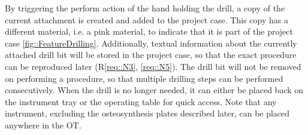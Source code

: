 By triggering the perform action of the hand holding the drill, a copy of the current attachment is created and added to the project case. 
This copy has a different material, i.e. a pink material, to indicate that it is part of the project case \ref{fig::FeatureDrilling}.
Additionally, textual information about the currently attached drill bit will be stored in the project case, so that the exact procedure can be reproduced later (R\ref{req::N3}, \ref{req::N5}).
The drill bit will not be removed on performing a procedure, so that multiple drilling steps can be performed consecutively.
When the drill is no longer needed, it can either be placed back on the instrument tray or the operating table for quick access.
Note that any instrument, excluding the osteosynthesis plates described later, can be placed anywhere in the OT.